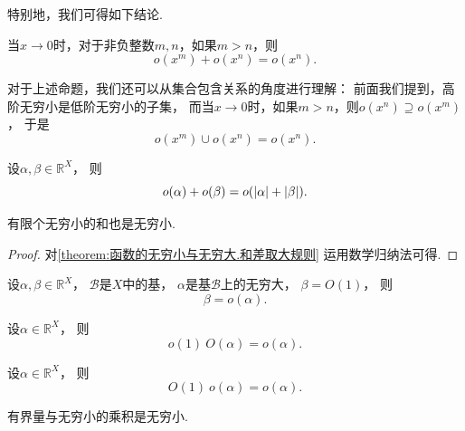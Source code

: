 特别地，我们可得如下结论.
\begin{corollary}
当\(x\to0\)时，对于非负整数\(m,n\)，如果\(m>n\)，则\begin{equation*}
	o(x^m) + o(x^n) = o(x^n).
\end{equation*}
\end{corollary}
\begin{remark}
对于上述命题，我们还可以从集合包含关系的角度进行理解：
前面我们提到，高阶无穷小是低阶无穷小的子集，
而当\(x\to0\)时，如果\(m>n\)，则\(o(x^n) \supseteq o(x^m)\)，
于是\begin{equation*}
	o(x^m) \cup o(x^n) = o(x^n).
\end{equation*}
\end{remark}

\begin{proposition}
设\(\alpha,\beta\in\mathbb{R}^X\)，
则\begin{equation*}
	o(\alpha) + o(\beta) = o(\abs{\alpha} + \abs{\beta}).
\end{equation*}
\end{proposition}
\begin{theorem}
有限个无穷小的和也是无穷小.
\begin{proof}
对\cref{theorem:函数的无穷小与无穷大.和差取大规则} 运用数学归纳法可得.
\end{proof}
\end{theorem}

\begin{proposition}
设\(\alpha,\beta\in\mathbb{R}^X\)，
\(\mathcal{B}\)是\(X\)中的基，
\(\alpha\)是基\(\mathcal{B}\)上的无穷大，
\(\beta=O(1)\)，
则\begin{equation*}
	\beta = o(\alpha).
\end{equation*}
\end{proposition}
\begin{proposition}
设\(\alpha\in\mathbb{R}^X\)，
则\begin{equation*}
	o(1)~O(\alpha) = o(\alpha).
\end{equation*}
\end{proposition}
\begin{proposition}
设\(\alpha\in\mathbb{R}^X\)，
则\begin{equation*}
	O(1)~o(\alpha) = o(\alpha).
\end{equation*}
\end{proposition}
\begin{theorem}\label{theorem:函数极限.无穷小.有界函数与无穷小的乘积是无穷小}
有界量与无穷小的乘积是无穷小.
\end{theorem}

